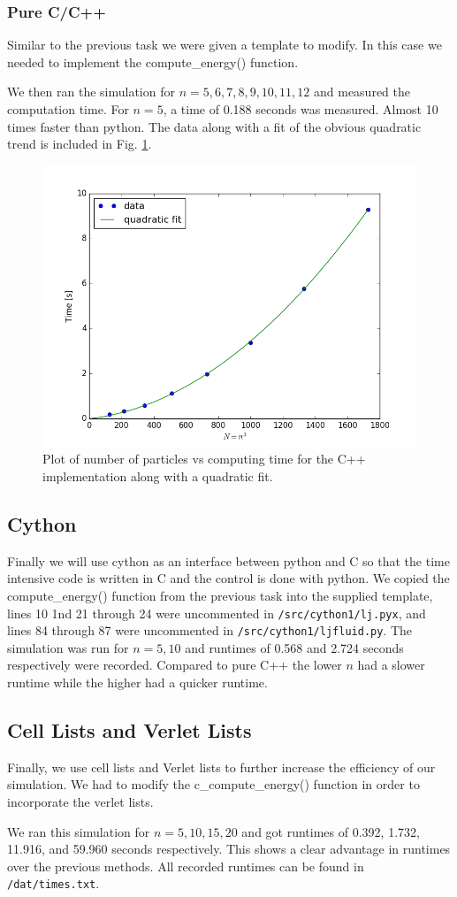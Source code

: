 \documentclass[11pt,a4paper]{scrartcl}
\makeatletter
\newcommand{\listfile}[7][MyPythonStyle]{
}
\makeatother
\begin{document}
\subsubsection{Pure C/C++}
Similar to the previous task we were given a template to modify. In this case we needed to implement the compute\_energy() function.
 \listfile[myCStyle]{../src/ljfluid.cpp}{/src/ljfluid.cpp}{73}{91}{Compute Energy}{computeenergy}
We then ran the simulation for $n = {5,6,7,8,9,10,11,12}$ and measured the computation time. For $n=5$, a time of 0.188 seconds was measured. Almost 10 times faster than python. The data along with a fit of the obvious quadratic trend is included in Fig. \ref{fig:cpp}.
\begin{figure}[h]
\includegraphics[width=0.7\linewidth]{../fig/fit.png}
  \centering
  \caption{Plot of number of particles vs computing time for the C++ implementation along with a quadratic fit.}
\label{fig:cpp}
\end{figure}
\subsection{Cython}
Finally we will use cython as an interface between python and C so that the time intensive code is written in C and the control is done with python. We copied the compute\_energy() function from the previous task into the supplied template, lines 10 1nd 21 through 24 were uncommented in {\tt /src/cython1/lj.pyx}, and lines 84 through 87 were uncommented in {\tt /src/cython1/ljfluid.py}. The simulation was run for $n = {5,10}$ and runtimes of 0.568 and 2.724 seconds respectively were recorded. Compared to pure C++ the lower $n$ had a slower runtime while the higher had a quicker runtime.
\subsection{Cell Lists and Verlet Lists}
Finally, we use cell lists and Verlet lists to further increase the efficiency of our simulation. We had to modify the c\_compute\_energy() function in order to incorporate the verlet lists.
\listfile[myCStyle]{../src/cython2/c_lj.cpp}{/src/cython2/c\_lj.cpp}{89}{111}{Compute Energy Verlet}{computeenergyverlet}
We ran this simulation for $n = {5, 10, 15, 20}$ and got runtimes of 0.392, 1.732, 11.916, and 59.960 seconds respectively. This shows a clear advantage in runtimes over the previous methods. All recorded runtimes can be found in {\tt /dat/times.txt}.
\end{document}
